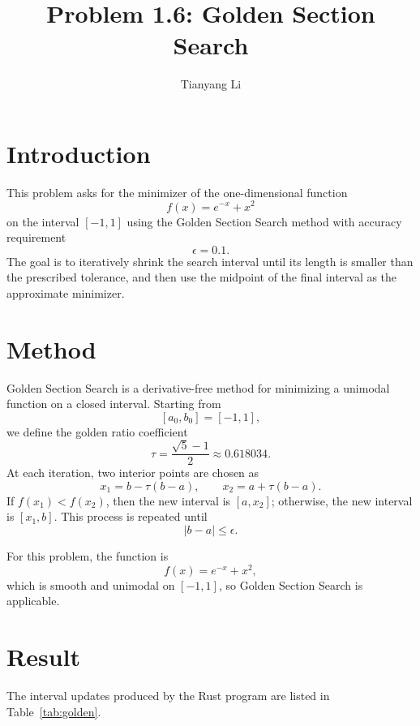 \documentclass{article}
\title{Problem 1.6: Golden Section Search}
\author{Tianyang Li}
\begin{document}
\maketitle

\section{Introduction}

This problem asks for the minimizer of the one-dimensional function
\[
    f(x) = e^{-x} + x^2
\]
on the interval $[-1,1]$ using the Golden Section Search method with accuracy requirement
\[
    \epsilon = 0.1.
\]
The goal is to iteratively shrink the search interval until its length is smaller than the prescribed tolerance, and then use the midpoint of the final interval as the approximate minimizer.

\section{Method}

Golden Section Search is a derivative-free method for minimizing a unimodal function on a closed interval. Starting from
\[
    [a_0,b_0] = [-1,1],
\]
we define the golden ratio coefficient
\[
    \tau = \frac{\sqrt{5}-1}{2} \approx 0.618034.
\]
At each iteration, two interior points are chosen as
\[
    x_1 = b - \tau(b-a), \qquad x_2 = a + \tau(b-a).
\]
If $f(x_1) < f(x_2)$, then the new interval is $[a,x_2]$; otherwise, the new interval is $[x_1,b]$. This process is repeated until
\[
    |b-a| \le \epsilon.
\]

For this problem, the function is
\[
    f(x) = e^{-x} + x^2,
\]
which is smooth and unimodal on $[-1,1]$, so Golden Section Search is applicable.

\section{Result}

The interval updates produced by the Rust program are listed in Table~\ref{tab:golden}.
\end{document}
